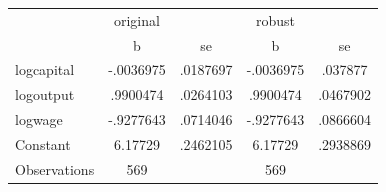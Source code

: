 \begin{tabular}{l*{2}{cc}}
                    &    original&            &      robust&            \\
                    &           b&          se&           b&          se\\
logcapital          &   -.0036975&    .0187697&   -.0036975&     .037877\\
logoutput           &    .9900474&    .0264103&    .9900474&    .0467902\\
logwage             &   -.9277643&    .0714046&   -.9277643&    .0866604\\
Constant            &     6.17729&    .2462105&     6.17729&    .2938869\\
Observations        &         569&            &         569&            \\
\end{tabular}
